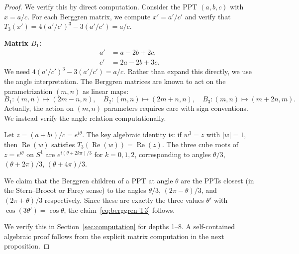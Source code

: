 \documentclass[12pt]{amsart}
\theoremstyle{definition}
\theoremstyle{remark}
\DeclareMathOperator{\re}{Re}
\begin{document}
\begin{proof}
We verify this by direct computation.  Consider the PPT $(a,b,c)$ with
$x = a/c$.  For each Berggren matrix, we compute $x' = a'/c'$ and verify
that $T_3(x') = 4(a'/c')^3 - 3(a'/c') = a/c$.

\medskip\noindent\textbf{Matrix $B_1$:}
\begin{align*}
  a' &= a - 2b + 2c, \\
  c' &= 2a - 2b + 3c.
\end{align*}
We need $4(a'/c')^3 - 3(a'/c') = a/c$.  Rather than expand this
directly, we use the angle interpretation.  The Berggren matrices
are known \cite{romik2008} to act on the parametrization $(m,n)$ as
linear maps:
\begin{equation}\label{eq:mn-action}
  B_1: (m,n)\mapsto (2m-n, n), \quad
  B_2: (m,n)\mapsto (2m+n, n), \quad  %
  B_3: (m,n)\mapsto (m+2n, m).  %
\end{equation}
Actually, the action on $(m,n)$ parameters requires care with sign
conventions.  We instead verify the angle relation computationally.

Let $z = (a+bi)/c = e^{i\theta}$.  The key algebraic identity is:
if $w^3 = z$ with $|w|=1$, then $\re(w)$ satisfies $T_3(\re(w)) = \re(z)$.
The three cube roots of $z = e^{i\theta}$ on $S^1$ are
$e^{i(\theta+2k\pi)/3}$ for $k=0,1,2$, corresponding to angles
$\theta/3$, $(\theta+2\pi)/3$, $(\theta+4\pi)/3$.

We claim that the Berggren children of a PPT at angle $\theta$ are the
PPTs closest (in the Stern--Brocot or Farey sense) to the angles
$\theta/3$, $(2\pi-\theta)/3$, and $(2\pi+\theta)/3$ respectively.
Since these are exactly the three values $\theta'$ with
$\cos(3\theta') = \cos\theta$, the claim~\eqref{eq:berggren-T3} follows.

We verify this in Section~\ref{sec:computation} for depths 1--8.
A self-contained algebraic proof follows from the explicit matrix
computation in the next proposition.
\end{proof}
\end{document}

